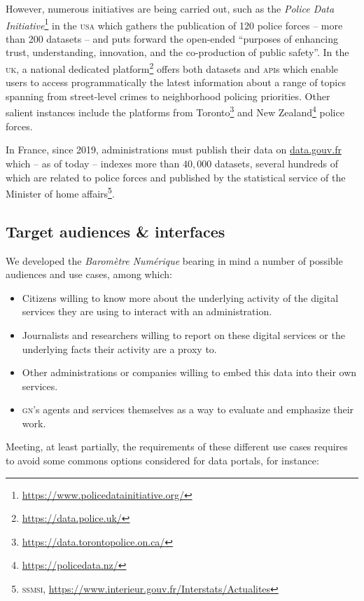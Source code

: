\documentclass[11pt,a4paper,twocolumn,USenglish]{article}
\begin{document}
However, numerous initiatives are being carried out, such as the \emph{Police Data Initiative}\footnote{\url{https://www.policedatainitiative.org/}} in the \textsc{usa} which gathers the publication of 120 police forces -- more than 200 datasets -- and puts forward the open-ended ``purposes of enhancing trust, understanding, innovation, and the co-production of public safety''. In the \textsc{uk}, a national dedicated platform\footnote{\url{https://data.police.uk/}} offers both datasets and \textsc{api}s which enable users to access programmatically the latest information about a range of topics spanning from street-level crimes to neighborhood policing priorities. Other salient instances include the platforms from Toronto\footnote{\url{https://data.torontopolice.on.ca/}} and New Zealand\footnote{\url{https://policedata.nz/}} police forces.

In France, since 2019, administrations must publish their data on \href{https://data.gouv.fr/}{data.gouv.fr} which -- as of today -- indexes more than $40,000$ datasets, several hundreds of which are related to police forces and published by the statistical service of the Minister of home affairs\footnote{\textsc{ssmsi}, \url{https://www.interieur.gouv.fr/Interstats/Actualites}}.


\subsection*{Target audiences \& interfaces}

We developed the \emph{Baromètre Numérique} bearing in mind a number of possible audiences and use cases, among which:

\begin{itemize}
  \item Citizens willing to know more about the underlying activity of the digital services they are using to interact with an administration.
  \item Journalists and researchers willing to report on these digital services or the underlying facts their activity are a proxy to.
  \item Other administrations or companies willing to embed this data into their own services.
  \item \textsc{gn}'s agents and services themselves as a way to evaluate and emphasize their work.
\end{itemize}

Meeting, at least partially, the requirements of these different use cases requires to avoid some commons options considered for data portals, for instance: 
\end{document}
